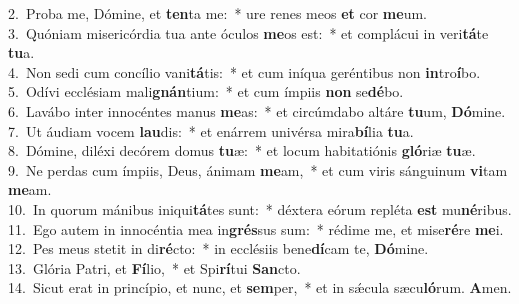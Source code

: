 {2.~}Proba me, Dómine, et \textbf{ten}ta me:~* ure renes meos \textbf{et} cor \textbf{me}um.\\
{3.~}Quóniam misericórdia tua ante óculos \textbf{me}os est:~* et complácui in veri\textbf{tá}te \textbf{tu}a.\\
{4.~}Non sedi cum concílio vani\textbf{tá}tis:~* et cum iníqua geréntibus non \textbf{in}tro\textbf{í}bo.\\
{5.~}Odívi ecclésiam mali\textbf{gnán}tium:~* et cum ímpiis \textbf{non} se\textbf{dé}bo.\\
{6.~}Lavábo inter innocéntes manus \textbf{me}as:~* et circúmdabo altáre \textbf{tu}um, \textbf{Dó}mine.\\
{7.~}Ut áudiam vocem \textbf{lau}dis:~* et enárrem univérsa mira\textbf{bí}lia \textbf{tu}a.\\
{8.~}Dómine, diléxi decórem domus \textbf{tu}æ:~* et locum habitatiónis \textbf{gló}riæ \textbf{tu}æ.\\
{9.~}Ne perdas cum ímpiis, Deus, ánimam \textbf{me}am,~* et cum viris sánguinum \textbf{vi}tam \textbf{me}am.\\
{10.~}In quorum mánibus iniqui\textbf{tá}tes sunt:~* déxtera eórum repléta \textbf{est} mu\textbf{né}ribus.\\
{11.~}Ego autem in innocéntia mea in\textbf{grés}sus sum:~* rédime me, et mise\textbf{ré}re \textbf{me}i.\\
{12.~}Pes meus stetit in di\textbf{ré}cto:~* in ecclésiis bene\textbf{dí}cam te, \textbf{Dó}mine.\\
{13.~}Glória Patri, et \textbf{Fí}lio,~* et Spi\textbf{rí}tui \textbf{San}cto.\\
{14.~}Sicut erat in princípio, et nunc, et \textbf{sem}per,~* et in sǽcula sæcu\textbf{ló}rum. \textbf{A}men.\\

